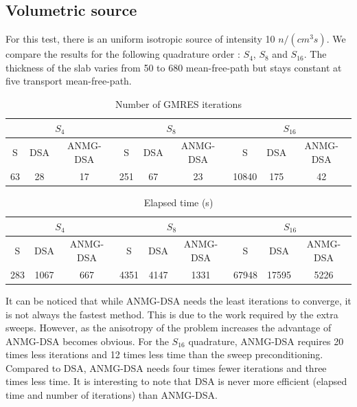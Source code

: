 \subsection{Volumetric source}
For this test, there is an uniform isotropic source of intensity 10 $n/(cm^3s)$. 
We compare the results for the following quadrature order : $S_4$, $S_8$ and 
$S_{16}$. The thickness of the slab varies from
50 to 680 mean-free-path but stays constant at five transport mean-free-path.
\begin{table}[H]
\begin{center}
\begin{tabular}{|c|c|c|c|c|c|c|c|c|}
\hline
\multicolumn{3}{|c|}{$S_4$} & \multicolumn{3}{c|}{$S_8$} & 
\multicolumn{3}{c|}{$S_{16}$} \\
\hline  
S & DSA & ANMG-DSA & S & DSA & ANMG-DSA & S & DSA & ANMG-DSA\\
\hline
63 & 28 & 17 & 251 & 67 & 23 & 10840 & 175 & 42 \\
\hline
\end{tabular}
\caption{Number of GMRES iterations}
\end{center}
\end{table}
\begin{table}[H]
\begin{center}
\begin{tabular}{|c|c|c|c|c|c|c|c|c|}
\hline
\multicolumn{3}{|c|}{$S_4$} & \multicolumn{3}{c|}{$S_8$} & 
\multicolumn{3}{c|}{$S_{16}$} \\
\hline  
S & DSA & ANMG-DSA & S & DSA & ANMG-DSA & S & DSA & ANMG-DSA\\
\hline
283 & 1067 & 667 & 4351 & 4147 & 1331 & 67948 & 17595 & 5226 \\
\hline
\end{tabular}
\caption{Elapsed time (s)}
\end{center}
\end{table}
It can be noticed that while ANMG-DSA needs the least iterations to converge, it is
not always the fastest method. This is due to the work required by the extra
sweeps. However, as the anisotropy of the problem increases the advantage of
ANMG-DSA becomes obvious. For the $S_{16}$ quadrature, ANMG-DSA requires 20 times 
less iterations and 12 times less time than the sweep preconditioning. 
Compared to DSA, ANMG-DSA needs four times fewer iterations and three times less 
time. It is interesting to note that DSA is never more efficient (elapsed
time and number of iterations) than ANMG-DSA.

